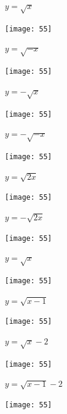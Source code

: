 \documentclass[a4paper]{oblivoir}
\begin{document}
\clearpage
\begin{minipage}{0.45\textwidth}\centering
\(y=\sqrt x\)
\par\bigskip\texttt{[image: 55]}
\end{minipage}
\begin{minipage}{0.45\textwidth}\centering
\(y=\sqrt{-x}\)
\par\bigskip\texttt{[image: 55]}
\end{minipage}\bigskip\bigskip\par
\begin{minipage}{0.45\textwidth}\centering
\(y=-\sqrt x\)
\par\bigskip\texttt{[image: 55]}
\end{minipage}
\begin{minipage}{0.45\textwidth}\centering
\(y=-\sqrt{-x}\)
\par\bigskip\texttt{[image: 55]}
\end{minipage}\bigskip\bigskip\par
\begin{minipage}{0.45\textwidth}\centering
\(y=\sqrt{2x}\)
\par\bigskip\texttt{[image: 55]}
\end{minipage}
\begin{minipage}{0.45\textwidth}\centering
\(y=-\sqrt{2x}\)
\par\bigskip\texttt{[image: 55]}
\end{minipage}\bigskip\bigskip\par

\clearpage
\begin{minipage}{0.45\textwidth}\centering
\(y=\sqrt x\)
\par\bigskip\texttt{[image: 55]}
\end{minipage}
\begin{minipage}{0.45\textwidth}\centering
\(y=\sqrt{x-1}\)
\par\bigskip\texttt{[image: 55]}
\end{minipage}\bigskip\bigskip\par
\begin{minipage}{0.45\textwidth}\centering
\(y=\sqrt{x}-2\)
\par\bigskip\texttt{[image: 55]}
\end{minipage}
\begin{minipage}{0.45\textwidth}\centering
\(y=\sqrt{x-1}-2\)
\par\bigskip\texttt{[image: 55]}
\end{minipage}\bigskip\bigskip\par
\end{document}
